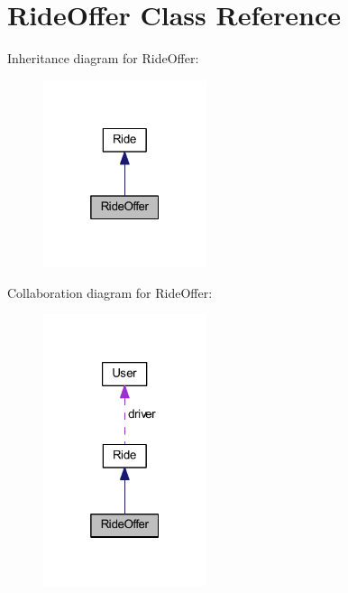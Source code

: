 \hypertarget{class_ride_offer}{}\section{Ride\+Offer Class Reference}
\label{class_ride_offer}


Inheritance diagram for Ride\+Offer\+:\nopagebreak
\begin{figure}[H]
\begin{center}
\leavevmode
\includegraphics[width=136pt]{class_ride_offer__inherit__graph}
\end{center}
\end{figure}


Collaboration diagram for Ride\+Offer\+:\nopagebreak
\begin{figure}[H]
\begin{center}
\leavevmode
\includegraphics[width=136pt]{class_ride_offer__coll__graph}
\end{center}
\end{figure}
